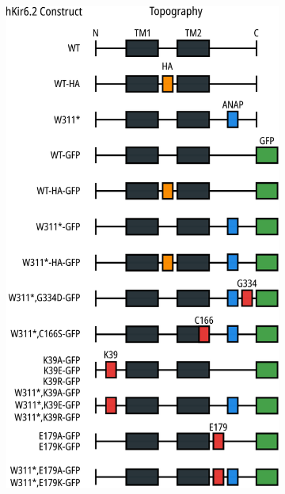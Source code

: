 \begin{figure}[h]
	\centering
	\begin{subfigure}[t]{0.45\textwidth}
		\caption{}\label{ch0fig:kir_constructs}
		\centering
		\includegraphics[width=\textwidth]{kir_constructs.pdf}
	\end{subfigure}
	\hfill
	\begin{subfigure}[t]{0.45\textwidth}
		\caption{}\label{ch0fig:sur_constructs}
		\centering

\end{subfigure}
\end{figure}
